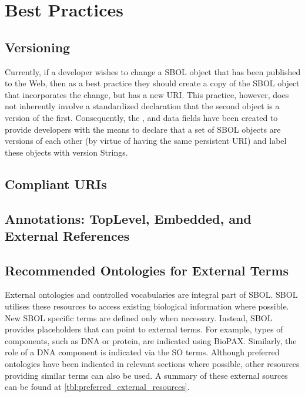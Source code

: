 \section{Best Practices}
\label{sec:bestpractices}
\subsection{Versioning}
Currently, if a developer wishes to change a SBOL object that has been published to the Web, then as a best practice they should create a copy of the SBOL object that incorporates the change, but has a new URI. This practice, however, does not inherently involve a standardized declaration that the second object is a version of the first. Consequently, the , and  data fields have been created to provide developers with the means to declare that a set of SBOL objects are versions of each other (by virtue of having the same persistent URI) and label these objects with version Strings.


\subsection{Compliant URIs}



\subsection{Annotations: TopLevel, Embedded, and External References}


\subsection{Recommended Ontologies for External Terms}
External ontologies and controlled vocabularies are integral part of SBOL. SBOL utilises these resources to access existing biological information where possible. New SBOL specific terms are defined only when necessary. Instead, SBOL provides placeholders that can point to external terms. For example, types of components, such as DNA or protein, are indicated using BioPAX. Similarly, the role of a DNA component is indicated via the SO terms. Although preferred ontologies have been indicated in relevant sections where possible, other resources providing similar terms can also be used. A summary of these external sources can be found at \ref{tbl:preferred_external_resources}.

